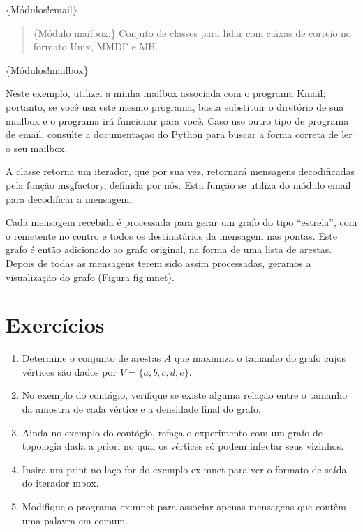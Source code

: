 \documentclass[a4paper,10pt,brazil]{sphinxmanual}
\begin{document}
\{Módulos!email\}
\begin{quote}

\{Módulo mailbox:\} Conjuto de classes para lidar com caixas de
correio no formato Unix, MMDF e MH.
\end{quote}

\{Módulos!mailbox\}

Neste exemplo, utilizei a minha mailbox associada com o programa
Kmail; portanto, se você usa este mesmo programa, basta substituir
o diretório de sua mailbox e o programa irá funcionar para você.
Caso use outro tipo de programa de email, consulte a documentaçao
do Python para buscar a forma correta de ler o seu mailbox.

A classe  retorna um iterador, que por sua vez,
retornará mensagens decodificadas pela função msgfactory, definida
por nós. Esta função se utiliza do módulo email para decodificar a
mensagem.

Cada mensagem recebida é processada para gerar um grafo do tipo
``estrela'', com o remetente no centro e todos os destinatários da
mensagem nas pontas. Este grafo é então adicionado ao grafo
original, na forma de uma lista de arestas. Depois de todas as
mensagens terem sido assim processadas, geramos a visualização do
grafo (Figura fig:mnet).


\chapter{Exercícios}
\label{capgraph:exercicios}\begin{enumerate}
\item {} 
Determine o conjunto de arestas $A$ que maximiza o tamanho
do grafo cujos vértices são dados por $V=\{a,b,c,d,e\}$.

\item {} 
No exemplo do contágio, verifique se existe alguma relação entre o
tamanho da amostra de cada vértice e a densidade final do grafo.

\item {} 
Ainda no exemplo do contágio, refaça o experimento com um grafo de
topologia dada a priori no qual os vértices só podem infectar seus
vizinhos.

\item {} 
Insira um print no laço for do exemplo ex:mnet para ver o formato
de saída do iterador mbox.

\item {} 
Modifique o programa ex:mnet para associar apenas mensagens que
contêm uma palavra em comum.

\end{enumerate}
\end{document}
